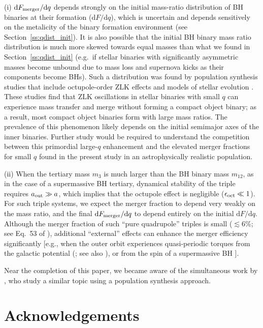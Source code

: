 \documentclass[
        fleqn,
        usenatbib,
    ]{mnras}
\newcommand*{\md}[0]{\mathrm{d}}
\begin{document}
(i) $\md F_{\rm merger}/\md q$ depends strongly on the initial mass-ratio
distribution of BH binaries at their formation ($\md F/\md q$), which is
uncertain and depends sensitively on the metalicity of the binary formation
environment (see Section~\ref{ss:qdist_init}). It is also possible that the
initial BH binary mass ratio distribution is much more skewed towards equal
masses than what we found in Section~\ref{ss:qdist_init} (e.g.\ if stellar
binaries with significantly asymmetric masses become unbound due to mass loss
and supernova kicks as their components become BHs). Such a
distribution was found by population synthesis studies that include
octupole-order ZLK effects and models of stellar evolution
\citep[e.g.][]{Hamers_q, toonen2018rate}. These studies find that ZLK
oscillations in stellar binaries with small $q$ can experience mass transfer and
merge without forming a compact object binary; as a result, most compact object
binaries form with large mass ratios. The prevalence of this phenomenon likely
depends on the initial semimajor axes of the inner binaries. Further study would
be required to understand the competition between this primordial large-$q$
enhancement and the elevated merger fractions for small $q$ found in the present
study in an astrophysically realistic population.

(ii) When the tertiary mass $m_3$ is much larger than the BH binary mass
$m_{12}$, as in the case of a supermassive BH tertiary, dynamical stability of
the triple requires $a_{\rm out} \gg a$, which implies that the octupole effect
is negligible ($\epsilon_{\rm oct}\ll 1$). For such triple systems, we expect
the merger fraction to depend very weakly on the mass ratio, and the final $\md
F_{\rm merger}/\md q$ to depend entirely on the initial $\md F/\md q$. Although
the merger fraction of such ``pure quadrupole'' triples is small ($\lesssim
6\%$; see Eq.~53 of \citealp{LL18}), additional ``external'' effects can enhance
the merger efficiency significantly [e.g., when the outer orbit experiences
quasi-periodic torques from the galactic potential
(\citealp{petrovich2017greatly}; see also \citealp{hamers2017secular}), or from
the spin of a supermassive BH \citep{LLW_apjl}].

Near the completion of this paper, we became aware of the simultaneous work by
\citet{martinez2021mass}, who study a similar topic using a population synthesis
approach.

\section{Acknowledgements}\label{s:ack}
\end{document}
